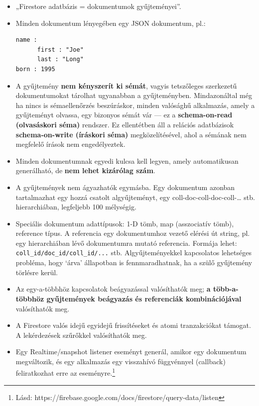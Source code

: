 \documentclass[
  magyar,
]{article}
\begin{document}
\begin{itemize}
\item
  „Firestore adatbázis = dokumentumok gyűjteményei''.
\item
  Minden dokumentum lényegében egy JSON dokumentum, pl.:

\begin{verbatim}
name :
      first : "Joe"
      last : "Long"
born : 1995
\end{verbatim}
\item
  A gyűjtemény \textbf{nem kényszerít ki sémát}, vagyis tetszőleges
  szerkezetű dokumentumokat tárolhat ugyanabban a gyűjteményben.
  Mindazonáltal még ha nincs is sémaellenőrzés beszúráskor, minden
  valósághű alkalmazás, amely a gyűjteményt olvassa, egy bizonyos sémát
  vár --- ez a \textbf{schema-on-read (olvasáskori séma)} rendszer. Ez
  ellentétben áll a relációs adatbázisok \textbf{schema-on-write
  (íráskori séma)} megközelítésével, ahol a sémának nem megfelelő írások
  nem engedélyeztek.
\item
  Minden dokumentumnak egyedi kulcsa kell legyen, amely automatikusan
  generálható, de \textbf{nem lehet kizárólag szám}.
\item
  A gyűjtemények nem ágyazhatók egymásba. Egy dokumentum azonban
  tartalmazhat egy hozzá csatolt algyűjteményt, egy
  coll-doc-coll-doc-coll-\ldots{} stb. hierarchiában, legfeljebb 100
  mélységig.
\item
  Speciális dokumentum adattípusok: 1-D tömb, map (asszociatív tömb),
  reference típus. A referencia egy dokumentumhoz vezető elérési út
  string, pl. egy hierarchiában lévő dokumentumra mutató referencia.
  Formája lehet: \texttt{coll\_id/doc\_id/coll\_id/...} stb.
  Algyűjteményekkel kapcsolatos lehetséges probléma, hogy `árva'
  állapotban is fennmaradhatnak, ha a szülő gyűjtemény törlésre kerül.
\item
  Az egy-a-többhöz kapcsolatok beágyazással valósíthatók meg; \textbf{a
  több-a-többhöz gyűjtemények beágyazás és referenciák kombinációjával}
  valósíthatók meg.
\item
  A Firestore valós idejű egyidejű frissítéseket és atomi tranzakciókat
  támogat. A lekérdezések szűrőkkel valósíthatók meg.
\item
  Egy Realtime/snapshot listener eseményt generál, amikor egy dokumentum
  megváltozik, és egy alkalmazás egy visszahívó függvénnyel (callback)
  feliratkozhat erre az eseményre.\footnote{Lásd:
    https://firebase.google.com/docs/firestore/query-data/listen}
\end{itemize}
\end{document}
